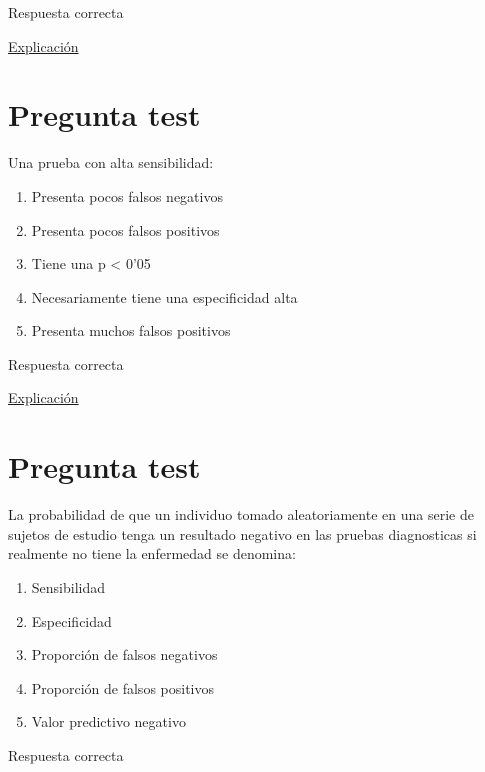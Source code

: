 \documentclass[
]{book}
\providecommand{\tightlist}{%
  \setlength{\itemsep}{0pt}\setlength{\parskip}{0pt}}
\begin{document}
Respuesta correcta

\href{https://1fjmanzano.github.io/bioestadistica/relaci\%C3\%B3n-entre-variables-cualitativas.html\#diagno\%CC\%81stico-cli\%CC\%81nico}{Explicación}

\hypertarget{pregunta-test-171}{%
\section{Pregunta test}\label{pregunta-test-171}}

Una prueba con alta sensibilidad:

\begin{enumerate}
\def\labelenumi{\alph{enumi})}
\tightlist
\item
  Presenta pocos falsos negativos
\item
  Presenta pocos falsos positivos
\item
  Tiene una p \textless{} 0'05
\item
  Necesariamente tiene una especificidad alta
\item
  Presenta muchos falsos positivos
\end{enumerate}

Respuesta correcta

\href{https://1fjmanzano.github.io/bioestadistica/relaci\%C3\%B3n-entre-variables-cualitativas.html\#diagno\%CC\%81stico-cli\%CC\%81nico}{Explicación}

\hypertarget{pregunta-test-172}{%
\section{Pregunta test}\label{pregunta-test-172}}

La probabilidad de que un individuo tomado aleatoriamente en una serie de sujetos de estudio tenga un resultado negativo en las pruebas diagnosticas si realmente no tiene la enfermedad se denomina:

\begin{enumerate}
\def\labelenumi{\alph{enumi})}
\tightlist
\item
  Sensibilidad
\item
  Especificidad
\item
  Proporción de falsos negativos
\item
  Proporción de falsos positivos
\item
  Valor predictivo negativo
\end{enumerate}

Respuesta correcta
\end{document}
